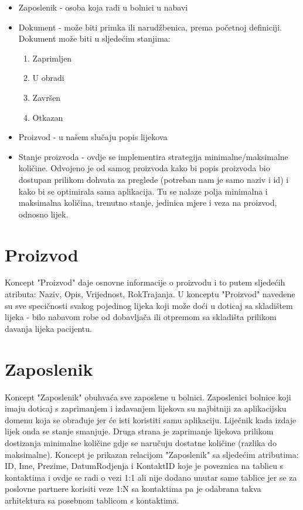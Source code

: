 \documentclass[a4paper,12pt]{foi}
\begin{document}
\begin{itemize}
	\item Zaposlenik - osoba koja radi u bolnici u nabavi 
	\item Dokument - može biti primka ili narudžbenica, prema početnoj definiciji. Dokument može biti u sljedećim stanjima:
		\begin{enumerate}
			\item Zaprimljen
			\item U obradi
			\item Završen
			\item Otkazan
		\end{enumerate}
	\item Proizvod - u našem slučaju popis lijekova
	\item Stanje proizvoda - ovdje se implementira strategija minimalne/maksimalne količine. Odvojeno je od samog proizvoda kako bi popis proizvoda bio dostupan prilikom dohvata za preglede (potreban nam je samo naziv i id) i kako bi se optimirala sama aplikacija. Tu se nalaze polja minimalna i maksimalna količina, trenutno stanje, jedinica mjere i veza na proizvod, odnosno lijek.
\end{itemize}

\section{Proizvod}

Koncept "Proizvod" daje osnovne informacije o proizvodu i to putem sljedećih atributa: Naziv, Opis, Vrijednost, RokTrajanja.
U konceptu "Proizvod" navedene su sve specičnosti svakog pojedinog lijeka koji može doći u doticaj sa skladištem lijeka - bilo nabavom robe od dobavljača ili otpremom sa skladišta prilikom davanja lijeka pacijentu.

\section{Zaposlenik}

Koncept "Zaposlenik" obuhvaća sve zaposlene u bolnici. Zaposlenici bolnice  koji imaju doticaj s zaprimanjem i izdavanjem lijekova su najbitniji za aplikacijsku domenu koja se obrađuje jer će isti koristiti samu aplikaciju. Liječnik kada izdaje lijek onda se stanje smanjuje. Druga strana je zaprimanje lijekova prilikom dostizanja minimalne količine gdje se naručuju dostatne količine (razlika do maksimalne). Koncept je prikazan relacijom "Zaposlenik" sa sljedećim atributima: ID, Ime, Prezime, DatumRodjenja i KontaktID koje je poveznica na tablicu s kontaktima i ovdje se radi o vezi 1:1 ali nije dodano unutar same tablice jer se za poslovne partnere korisiti veze 1:N sa kontaktima pa je odabrana takva arhitektura sa posebnom tablicom s kontaktima.
\end{document}
